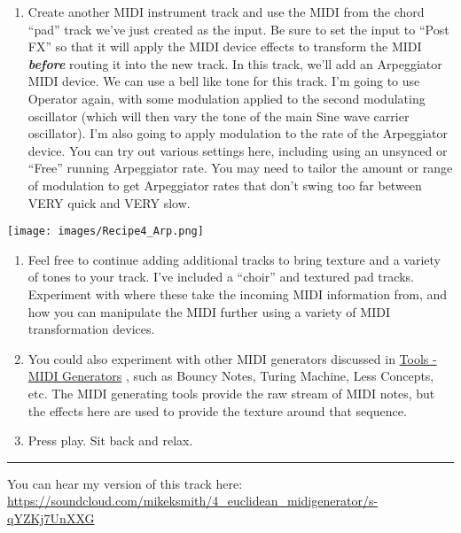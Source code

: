 \documentclass[
  12pt,
  letterpaper,
  oneside,
  open=any]{scrbook}
\providecommand{\tightlist}{%
  \setlength{\itemsep}{0pt}\setlength{\parskip}{0pt}}\usepackage{longtable,booktabs,array}
\begin{document}
\begin{enumerate}
\def\labelenumi{\arabic{enumi}.}
\setcounter{enumi}{3}
\tightlist
\item
  Create another MIDI instrument track and use the MIDI from the chord
  ``pad'' track we've just created as the input. Be sure to set the
  input to ``Post FX'' so that it will apply the MIDI device effects to
  transform the MIDI \textbf{\emph{before}} routing it into the new
  track. In this track, we'll add an Arpeggiator MIDI device. We can use
  a bell like tone for this track. I'm going to use Operator again, with
  some modulation applied to the second modulating oscillator (which
  will then vary the tone of the main Sine wave carrier oscillator). I'm
  also going to apply modulation to the rate of the Arpeggiator device.
  You can try out various settings here, including using an unsynced or
  ``Free'' running Arpeggiator rate. You may need to tailor the amount
  or range of modulation to get Arpeggiator rates that don't swing too
  far between VERY quick and VERY slow.
\end{enumerate}

\texttt{[image: images/Recipe4\_Arp.png]}

\begin{enumerate}
\def\labelenumi{\arabic{enumi}.}
\setcounter{enumi}{4}
\item
  Feel free to continue adding additional tracks to bring texture and a
  variety of tones to your track. I've included a ``choir'' and textured
  pad tracks. Experiment with where these take the incoming MIDI
  information from, and how you can manipulate the MIDI further using a
  variety of MIDI transformation devices.
\item
  You could also experiment with other MIDI generators discussed in
  \hyperref[Chapter-012-Tools-MIDI_Generators]{Tools - MIDI Generators}
  , such as Bouncy Notes, Turing Machine, Less Concepts, etc. The MIDI
  generating tools provide the raw stream of MIDI notes, but the effects
  here are used to provide the texture around that sequence.
\item
  Press play. Sit back and relax.
\end{enumerate}

\begin{center}\rule{0.5\linewidth}{0.5pt}\end{center}

You can hear my version of this track here:
\href{https://soundcloud.com/mikeksmith/4_euclidean_midigenerator/s-qYZKj7UnXXG?in=mikeksmith/sets/the-lazy-producer-recipes/s-PGMEWqfwKGz&si=6b1ee90238dd4a3c9fe75f66fd1f6623&utm_source=clipboard&utm_medium=text&utm_campaign=social_sharing}{https://soundcloud.com/mikeksmith/4\_euclidean\_midigenerator/s-qYZKj7UnXXG}
\end{document}
